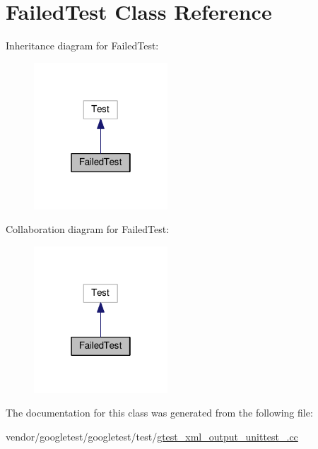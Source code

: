 \hypertarget{classFailedTest}{}\section{Failed\+Test Class Reference}
\label{classFailedTest}


Inheritance diagram for Failed\+Test\+:\nopagebreak
\begin{figure}[H]
\begin{center}
\leavevmode
\includegraphics[width=142pt]{classFailedTest__inherit__graph}
\end{center}
\end{figure}


Collaboration diagram for Failed\+Test\+:\nopagebreak
\begin{figure}[H]
\begin{center}
\leavevmode
\includegraphics[width=142pt]{classFailedTest__coll__graph}
\end{center}
\end{figure}


The documentation for this class was generated from the following file\+:\begin{DoxyCompactItemize}
\item 
vendor/googletest/googletest/test/\hyperlink{gtest__xml__output__unittest___8cc}{gtest\+\_\+xml\+\_\+output\+\_\+unittest\+\_\+.\+cc}\end{DoxyCompactItemize}
